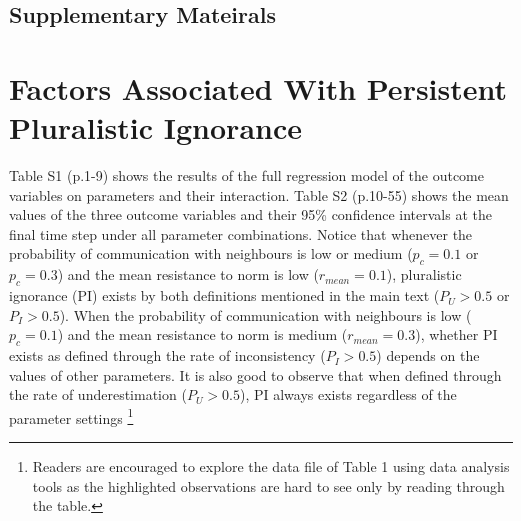 \documentclass[
  11pt,
]{article}
\author{}
\date{\vspace{-2.5em}}
\begin{document}
\begin{landscape}

\begin{center}

\hypertarget{supplementary-mateirals}{%
\section*{Supplementary Mateirals}\label{supplementary-mateirals}}

\end{center}

\hypertarget{factors-associated-with-persistent-pluralistic-ignorance}{%
\section{Factors Associated With Persistent Pluralistic
Ignorance}\label{factors-associated-with-persistent-pluralistic-ignorance}}

Table S1 (p.1-9) shows the results of the full regression model of the
outcome variables on parameters and their interaction. Table S2
(p.10-55) shows the mean values of the three outcome variables and their
95\% confidence intervals at the final time step under all parameter
combinations. Notice that whenever the probability of communication with
neighbours is low or medium (\(p_c = 0.1\) or \(p_c = 0.3\)) and the
mean resistance to norm is low (\(r_{mean} = 0.1\)), pluralistic
ignorance (PI) exists by both definitions mentioned in the main text
(\(P_U > 0.5\) or \(P_I > 0.5\)). When the probability of communication
with neighbours is low (\(p_c = 0.1\)) and the mean resistance to norm
is medium (\(r_{mean} = 0.3\)), whether PI exists as defined through the
rate of inconsistency (\(P_I > 0.5\)) depends on the values of other
parameters. It is also good to observe that when defined through the
rate of underestimation (\(P_U > 0.5\)), PI always exists regardless of
the parameter settings
\footnote{Readers are encouraged to explore the data file of Table 1 using data analysis tools as the highlighted observations are hard to see only by reading through the table.}

\renewcommand{\thetable}{S1}


\end{landscape}
\end{document}
